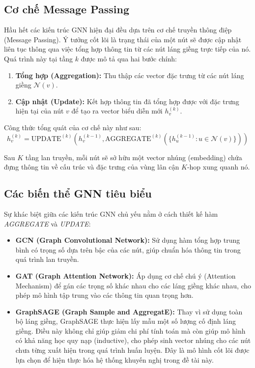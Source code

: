 \subsection{Cơ chế Message Passing}

Hầu hết các kiến trúc GNN hiện đại đều dựa trên cơ chế truyền thông điệp (Message Passing). Ý tưởng cốt lõi là trạng thái của một nút sẽ được cập nhật liên tục thông qua việc tổng hợp thông tin từ các nút láng giềng trực tiếp của nó. Quá trình này tại tầng $k$ được mô tả qua hai bước chính:

\begin{enumerate}
    \item \textbf{Tổng hợp (Aggregation):} Thu thập các vector đặc trưng từ các nút láng giềng $\mathcal{N}(v)$.
    \item \textbf{Cập nhật (Update):} Kết hợp thông tin đã tổng hợp được với đặc trưng hiện tại của nút $v$ để tạo ra vector biểu diễn mới $h_v^{(k)}$.
\end{enumerate}

Công thức tổng quát của cơ chế này như sau:
\begin{equation}
    h_v^{(k)} = \text{UPDATE}^{(k)} \left( h_v^{(k-1)}, \text{AGGREGATE}^{(k)} \left( \{ h_u^{(k-1)} : u \in \mathcal{N}(v) \} \right) \right)
\end{equation}

Sau $K$ tầng lan truyền, mỗi nút sẽ sở hữu một vector nhúng (embedding) chứa đựng thông tin về cấu trúc và đặc trưng của vùng lân cận $K$-hop xung quanh nó.

\subsection{Các biến thể GNN tiêu biểu}

Sự khác biệt giữa các kiến trúc GNN chủ yếu nằm ở cách thiết kế hàm \textit{AGGREGATE} và \textit{UPDATE}:

\begin{itemize}
    \item \textbf{GCN (Graph Convolutional Network):} Sử dụng hàm tổng hợp trung bình có trọng số dựa trên bậc của các nút, giúp chuẩn hóa thông tin trong quá trình lan truyền.
    \item \textbf{GAT (Graph Attention Network):} Áp dụng cơ chế chú ý (Attention Mechanism) để gán các trọng số khác nhau cho các láng giềng khác nhau, cho phép mô hình tập trung vào các thông tin quan trọng hơn.
    \item \textbf{GraphSAGE (Graph Sample and AggregatE):} Thay vì sử dụng toàn bộ láng giềng, GraphSAGE thực hiện lấy mẫu một số lượng cố định láng giềng. Điều này không chỉ giúp giảm chi phí tính toán mà còn giúp mô hình có khả năng học quy nạp (inductive), cho phép sinh vector nhúng cho các nút chưa từng xuất hiện trong quá trình huấn luyện. Đây là mô hình cốt lõi được lựa chọn để hiện thực hóa hệ thống khuyến nghị trong đề tài này.
\end{itemize}

